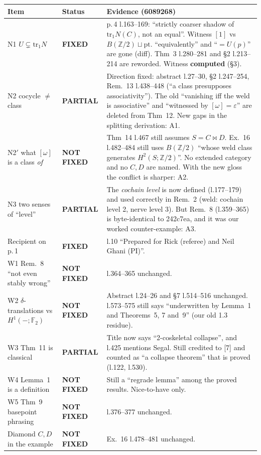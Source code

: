 \documentclass[11pt]{article}
\newcommand{\Z}{\mathbb{Z}}
\newcommand{\F}{\mathbb{F}}
\begin{document}
\begin{longtable}{p{3.0cm}p{2.1cm}p{9.9cm}}
\toprule
Item & Status & Evidence (6089268)\\\midrule\endhead
N1 $U\subsetneq\mathrm{tr}_1N$ & \textbf{FIXED} & p.\,4 l.163--169: ``strictly coarser shadow of $\mathrm{tr}_1N(C)$, not an equal''. Witness $[1]$ vs $B(\Z/2)\sqcup\mathrm{pt}$. ``equivalently'' and ``$=U(p)$'' are gone (diff). Thm~3 l.280--281 and \S2 l.213--214 are reworded. Witness \textbf{computed} (\S3).\\
N2 cocycle $\neq$ class & \textbf{PARTIAL} & Direction fixed: abstract l.27--30, \S2 l.247--254, Rem.~13 l.438--448 (``a class presupposes associativity''). The old ``vanishing iff the weld is associative'' and ``witnessed by $[\omega]=\varepsilon$'' are deleted from Thm~12. New gaps in the splitting derivation: A1.\\
N2$'$ what $[\omega]$ is a class \emph{of} & \textbf{NOT FIXED} & Thm~14 l.467 still assumes $S=C\bowtie D$. Ex.~16 l.482--484 still uses $B(\Z/2)$ ``whose weld class generates $H^2(S;\Z/2)$''. No extended category and no $C,D$ are named. With the new gloss the conflict is sharper: A2.\\
N3 two senses of ``level'' & \textbf{PARTIAL} & The \emph{cochain level} is now defined (l.177--179) and used correctly in Rem.~2 (weld: cochain level 2, nerve level 3). But Rem.~8 (l.359--365) is byte-identical to 242c7ea, and it was our worked counter-example: A3.\\
Recipient on p.\,1 & \textbf{FIXED} & l.10 ``Prepared for Rick (referee) and Neil Ghani (PI)''.\\
W1 Rem.~8 ``not even stably wrong'' & \textbf{NOT FIXED} & l.364--365 unchanged.\\
W2 $\delta$-translations vs $H^1(-;\F_2)$ & \textbf{NOT FIXED} & Abstract l.24--26 and \S7 l.514--516 unchanged. l.573--575 still says ``underwritten by Lemma~1 and Theorems~5, 7 and~9'' (our old 1.3 residue).\\
W3 Thm~11 is classical & \textbf{PARTIAL} & Title now says ``2-coskeletal collapse'', and l.425 mentions Segal. Still credited to [7] and counted as ``a collapse theorem'' that is proved (l.122, l.530).\\
W4 Lemma~1 is a definition & \textbf{NOT FIXED} & Still a ``regrade lemma'' among the proved results. Nice-to-have only.\\
W5 Thm~9 basepoint phrasing & \textbf{NOT FIXED} & l.376--377 unchanged.\\
Diamond $C,D$ in the example & \textbf{NOT FIXED} & Ex.~16 l.478--481 unchanged.\\
\bottomrule
\end{longtable}
\end{document}
